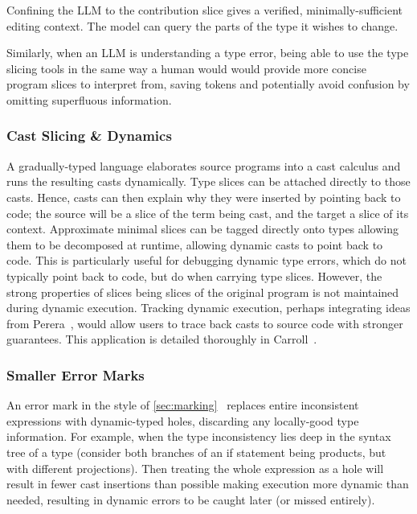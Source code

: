 Confining the LLM to the contribution slice gives a verified, minimally-sufficient editing context. The model can query the parts of the type it wishes to change. 

Similarly, when an LLM is understanding a type error, being able to use the type slicing tools in the same way a human would would provide more concise program slices to interpret from, saving tokens and potentially avoid confusion by omitting superfluous information.

\subsubsection{Cast Slicing \& Dynamics}
\label{sec:cast-dynamics}

A gradually-typed language elaborates source programs into a cast calculus and runs the resulting casts dynamically. Type slices can be attached directly to those casts. Hence, casts can then explain why they were inserted by pointing back to code; the source will be a slice of the term being cast, and the target a slice of its context. Approximate minimal slices can be tagged directly onto types allowing them to be decomposed at runtime, allowing dynamic casts to point back to code. This is particularly useful for debugging dynamic type errors, which do not typically point back to code, but do when carrying type slices. However, the strong properties of slices being slices of the original program is not maintained during dynamic execution. Tracking dynamic execution, perhaps integrating ideas from Perera~\cite{Perera2012,PereraGarg2016}, would allow users to trace back casts to source code with stronger guarantees. This application is detailed thoroughly in Carroll~\cite{Carroll2024}.

\subsubsection{Smaller Error Marks}
\label{sec:app-largest-valid}

An error mark in the style of \cref{sec:marking}~\cite{Marking2024} replaces entire inconsistent expressions with dynamic-typed holes, discarding any locally-good type information. For example, when the type inconsistency lies deep in the syntax tree of a type (consider both branches of an if statement being products, but with different projections). Then treating the whole expression as a hole will result in fewer cast insertions than possible making execution more dynamic than needed, resulting in dynamic errors to be caught later (or missed entirely).

